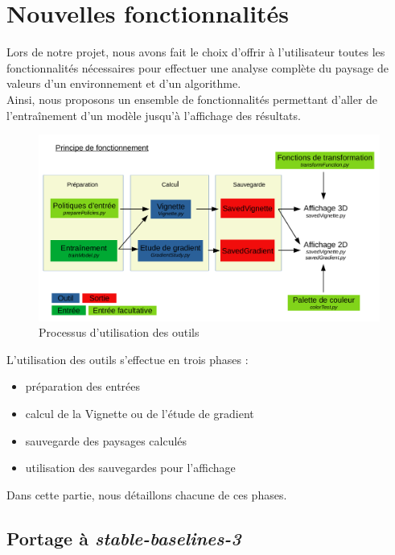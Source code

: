 \documentclass[12pt]{article}
\begin{document}
\section{Nouvelles fonctionnalités}

Lors de notre projet, nous avons fait le choix d'offrir à l'utilisateur toutes les fonctionnalités nécessaires pour effectuer une analyse complète du paysage de valeurs d'un environnement et d'un algorithme. \\

Ainsi, nous proposons un ensemble de fonctionnalités permettant d'aller de l'entraînement d'un modèle jusqu'à l'affichage des résultats. \\

\begin{figure}[htp]
    \centering
    \includegraphics[width=18cm]{Images/Principe}
    \caption{Processus d'utilisation des outils}
    \label{fig:principe}
\end{figure}

L'utilisation des outils s'effectue en trois phases : 
\begin{itemize}
	\item préparation des entrées
	\item calcul de la Vignette ou de l'étude de gradient
	\item sauvegarde des paysages calculés
	\item utilisation des sauvegardes pour l'affichage
\end{itemize}

Dans cette partie, nous détaillons chacune de ces phases.

\newpage
\subsection{Portage à \emph{stable-baselines-3}}
\end{document}
